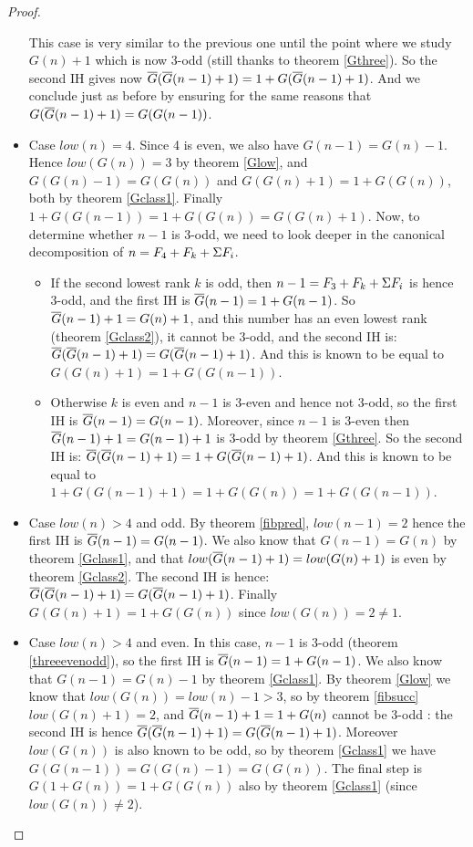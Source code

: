 \documentclass[a4paper,11pt]{article}
\begin{document}
\begin{proof}
\begin{itemize}
  This case is very similar to the previous one until the point
  where we study $G(n)+1$ which is now 3-odd (still thanks to theorem
  \ref{Gthree}).
  So the second IH gives now
  $\overline{G}(\overline{G}(n-1)+1) = 1+G(\overline{G}(n-1)+1)$. And we conclude just as before
  by ensuring for the same reasons that $G(\overline{G}(n-1)+1)=G(G(n-1))$.
\item Case $low(n)=4$.
  Since 4 is even, we also have $G(n-1)=G(n)-1$.
  Hence $low(G(n))=3$ by theorem \ref{Glow}, and $G(G(n)-1)=G(G(n))$
  and $G(G(n)+1)=1+G(G(n))$, both by theorem \ref{Gclass1}.
  Finally $1+G(G(n-1)) = 1+G(G(n)) = G(G(n)+1)$.
  Now, to determine whether $n-1$ is 3-odd,
  we need to look deeper in the canonical decomposition of
  $n = F_4+F_k+\Sigma F_i$.
  \begin{itemize}
  \item If the second lowest rank $k$ is odd, then
    $n-1 = F_3+F_k+\Sigma F_i$ is hence 3-odd, and the first IH is
    $\overline{G}(n-1)=1+G(n-1)$. So
    $\overline{G}(n-1)+1=G(n)+1$, and this number has an even lowest rank
    (theorem \ref{Gclass2}), it cannot be 3-odd, and the second IH
    is:
    $\overline{G}(\overline{G}(n-1)+1)=G(\overline{G}(n-1)+1)$. And this is known to be equal
    to $G(G(n)+1)=1+G(G(n-1))$.
  \item Otherwise $k$ is even and $n-1$ is 3-even
    and hence not 3-odd, so the first IH is $\overline{G}(n-1)=G(n-1)$.
    Moreover, since $n-1$ is 3-even then $\overline{G}(n-1)+1=G(n-1)+1$ is 3-odd by
    theorem \ref{Gthree}. So the second IH is:
    $\overline{G}(\overline{G}(n-1)+1)=1+G(\overline{G}(n-1)+1)$. And this is known to be equal
    to $1+G(G(n-1)+1)=1+G(G(n))=1+G(G(n-1))$.
  \end{itemize}
\item Case $low(n)>4$ and odd.
  By theorem \ref{fibpred}, $low(n-1)=2$ hence the first IH is
  $\overline{G}(n-1)=G(n-1)$. We also know that $G(n-1)=G(n)$ by theorem
  \ref{Gclass1}, and that $low(\overline{G}(n-1)+1)=low(G(n)+1)$ is even
  by theorem \ref{Gclass2}. The second IH is hence:
  $\overline{G}(\overline{G}(n-1)+1) = G(\overline{G}(n-1)+1)$. Finally
  $G(G(n)+1)=1+G(G(n))$ since $low(G(n))=2\neq 1$.
\item Case $low(n)>4$ and even.
  In this case, $n-1$ is 3-odd (theorem \ref{threeevenodd}), so
  the first IH is $\overline{G}(n-1)=1+G(n-1)$. We also know that
  $G(n-1)=G(n)-1$ by theorem \ref{Gclass1}.
  By theorem \ref{Glow} we know that $low(G(n))=low(n)-1 > 3$, so
  by theorem \ref{fibsucc} $low(G(n)+1)=2$, and
  $\overline{G}(n-1)+1=1+G(n)$ cannot be 3-odd : the second IH is hence
  $\overline{G}(\overline{G}(n-1)+1)=G(\overline{G}(n-1)+1)$. Moreover $low(G(n))$ is
  also known to be odd, so 
  by theorem \ref{Gclass1} we have $G(G(n-1))=G(G(n)-1)=G(G(n))$.
  The final step is
  $G(1+G(n))=1+G(G(n))$ also by theorem \ref{Gclass1} (since $low(G(n))\neq
  2$).
\end{itemize}
\end{proof}
\end{document}
